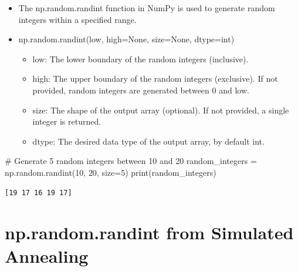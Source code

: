 \documentclass[
  letterpaper,
  DIV=11,
  numbers=noendperiod]{scrreprt}
\newenvironment{Shaded}{\begin{snugshade}}{\end{snugshade}}
\newcommand{\BuiltInTok}[1]{\textcolor[rgb]{0.00,0.23,0.31}{#1}}
\newcommand{\CommentTok}[1]{\textcolor[rgb]{0.37,0.37,0.37}{#1}}
\newcommand{\DecValTok}[1]{\textcolor[rgb]{0.68,0.00,0.00}{#1}}
\newcommand{\NormalTok}[1]{\textcolor[rgb]{0.00,0.23,0.31}{#1}}
\newcommand{\OperatorTok}[1]{\textcolor[rgb]{0.37,0.37,0.37}{#1}}
\providecommand{\tightlist}{%
  \setlength{\itemsep}{0pt}\setlength{\parskip}{0pt}}\usepackage{longtable,booktabs,array}
\begin{document}
\begin{itemize}
\item
  The np.random.randint function in NumPy is used to generate random
  integers within a specified range.
\item
  np.random.randint(low, high=None, size=None, dtype=int)

  \begin{itemize}
  \tightlist
  \item
    low: The lower boundary of the random integers (inclusive).
  \item
    high: The upper boundary of the random integers (exclusive). If not
    provided, random integers are generated between 0 and low.
  \item
    size: The shape of the output array (optional). If not provided, a
    single integer is returned.
  \item
    dtype: The desired data type of the output array, by default int.
  \end{itemize}
\end{itemize}

\begin{Shaded}
\begin{Highlighting}[]
\CommentTok{\# Generate 5 random integers between 10 and 20}
\NormalTok{random\_integers }\OperatorTok{=}\NormalTok{ np.random.randint(}\DecValTok{10}\NormalTok{, }\DecValTok{20}\NormalTok{, size}\OperatorTok{=}\DecValTok{5}\NormalTok{)}
\BuiltInTok{print}\NormalTok{(random\_integers)}
\end{Highlighting}
\end{Shaded}

\begin{verbatim}
[19 17 16 19 17]
\end{verbatim}

\section{np.random.randint from Simulated
Annealing}\label{np.random.randint-from-simulated-annealing}
\end{document}
